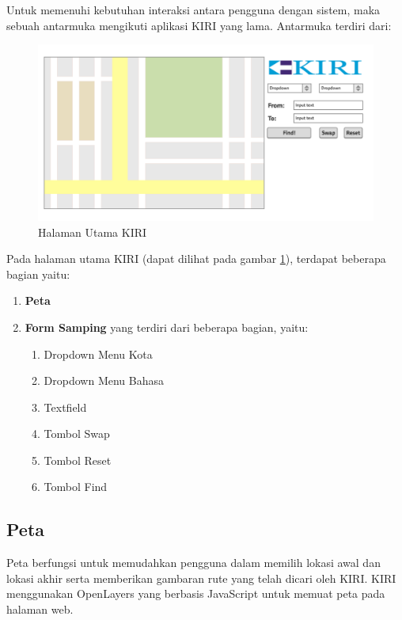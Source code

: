 Untuk memenuhi kebutuhan interaksi antara pengguna dengan sistem, maka sebuah antarmuka mengikuti aplikasi KIRI yang lama. Antarmuka terdiri dari:

\begin{figure}[H]
	\centering
	\includegraphics[scale=0.3]{Gambar/mockup-home}
	\caption{Halaman Utama KIRI} 
	\label{fig:4_KIRI_main}
\end{figure}

Pada halaman utama KIRI (dapat dilihat pada gambar \ref{fig:4_KIRI_main}), terdapat beberapa bagian yaitu:
    \begin{enumerate}
    		\item \textbf{Peta}
    		\item \textbf{Form Samping} yang terdiri dari beberapa bagian, yaitu:
    		\begin{enumerate}
    			\item Dropdown Menu Kota
    			\item Dropdown Menu Bahasa
    			\item Textfield
    			\item Tombol Swap
    			\item Tombol Reset
    			\item Tombol Find
    		\end{enumerate}
    \end{enumerate}

\subsection{Peta}
Peta berfungsi untuk memudahkan pengguna dalam memilih lokasi awal dan lokasi akhir serta memberikan gambaran rute yang telah dicari oleh KIRI. KIRI menggunakan OpenLayers yang berbasis JavaScript untuk memuat peta pada halaman web. 

